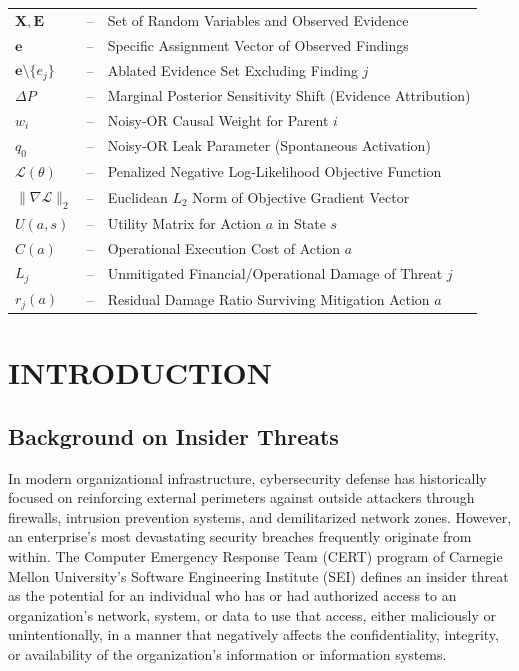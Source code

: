 \documentclass[12pt,a4paper]{report}
\begin{document}
\begin{longtable}{p{} p{} p{}}
$\mathbf{X}, \mathbf{E}$ & -- & Set of Random Variables and Observed Evidence \\
$\mathbf{e}$ & -- & Specific Assignment Vector of Observed Findings \\
$\mathbf{e} \setminus \{e_j\}$ & -- & Ablated Evidence Set Excluding Finding $j$ \\
$\Delta P$ & -- & Marginal Posterior Sensitivity Shift (Evidence Attribution) \\
$w_i$ & -- & Noisy-OR Causal Weight for Parent $i$ \\
$q_0$ & -- & Noisy-OR Leak Parameter (Spontaneous Activation) \\
$\mathcal{L}(\theta)$ & -- & Penalized Negative Log-Likelihood Objective Function \\
$\|\nabla \mathcal{L}\|_2$ & -- & Euclidean $L_2$ Norm of Objective Gradient Vector \\
$U(a, s)$ & -- & Utility Matrix for Action $a$ in State $s$ \\
$C(a)$ & -- & Operational Execution Cost of Action $a$ \\
$L_j$ & -- & Unmitigated Financial/Operational Damage of Threat $j$ \\
$r_j(a)$ & -- & Residual Damage Ratio Surviving Mitigation Action $a$ \\
\end{longtable}

\newpage
{}
\setcounter{page}{1}

\chapter{INTRODUCTION}

\section{Background on Insider Threats}
In modern organizational infrastructure, cybersecurity defense has historically focused on reinforcing external perimeters against outside attackers through firewalls, intrusion prevention systems, and demilitarized network zones. However, an enterprise's most devastating security breaches frequently originate from within. The Computer Emergency Response Team (CERT) program of Carnegie Mellon University's Software Engineering Institute (SEI) defines an insider threat as the potential for an individual who has or had authorized access to an organization's network, system, or data to use that access, either maliciously or unintentionally, in a manner that negatively affects the confidentiality, integrity, or availability of the organization's information or information systems.
\end{document}

